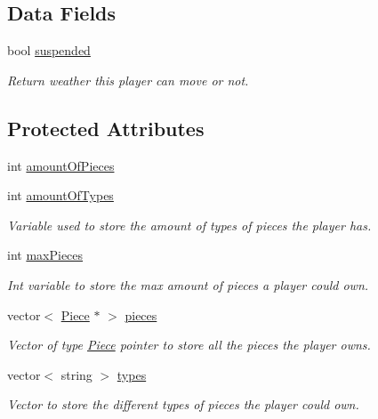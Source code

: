 \subsection*{Data Fields}
\begin{DoxyCompactItemize}
\item 
bool \hyperlink{classPlayer_a915c6031e68208b409ce8550419f6247}{suspended}
\begin{DoxyCompactList}\small\item\em Return weather this player can move or not. \end{DoxyCompactList}\end{DoxyCompactItemize}
\subsection*{Protected Attributes}
\begin{DoxyCompactItemize}
\item 
int \hyperlink{classPlayer_a02564dff78d55061c0afa08bfa5342e5}{amount\-Of\-Pieces}
\item 
int \hyperlink{classPlayer_a677f323efe4a7534a054345a4d99d40f}{amount\-Of\-Types}
\begin{DoxyCompactList}\small\item\em Variable used to store the amount of types of pieces the player has. \end{DoxyCompactList}\item 
int \hyperlink{classPlayer_a69e6c3b3ae77235f6f47c49b09e67331}{max\-Pieces}
\begin{DoxyCompactList}\small\item\em Int variable to store the max amount of pieces a player could own. \end{DoxyCompactList}\item 
vector$<$ \hyperlink{classPiece}{Piece} $\ast$ $>$ \hyperlink{classPlayer_a4e28d717089267557d014e440e910a3b}{pieces}
\begin{DoxyCompactList}\small\item\em Vector of type \hyperlink{classPiece}{Piece} pointer to store all the pieces the player owns. \end{DoxyCompactList}\item 
vector$<$ string $>$ \hyperlink{classPlayer_a05f23ead572f763fedd4488d6a82b822}{types}
\begin{DoxyCompactList}\small\item\em Vector to store the different types of pieces the player could own. \end{DoxyCompactList}\end{DoxyCompactItemize}


